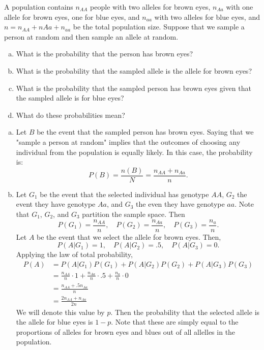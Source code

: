 \documentclass[addpoints,answers]{exam}
\begin{document}
\begin{questions}

\question
   A population contains $n_{AA}$ people with two alleles for brown eyes, $n_{Aa}$ with one allele for brown eyes, one for blue eyes, and $n_{aa}$ with two alleles for blue eyes, and $n=n_{AA}+n{Aa}+n_{aa}$ be the total population size. Suppose that we sample a person at random and then sample an allele at random.
  
  \begin{enumerate}[a)]
  \item What is the probability that the person has brown eyes?
  \item What is the probability that the sampled allele is the allele for brown eyes? 
  \item What is the probability that the sampled person has brown eyes given that the sampled allele is for blue eyes?
  \item What do these probabilities mean?
  \end{enumerate}
  
  \begin{solution}
  \begin{enumerate}[a)]
  \item Let $B$ be the event that the sampled person has brown eyes. Saying that we "sample a person at random" implies that the outcomes of choosing any individual from the population is equally likely. In this case, the probability is:
  $$
  P(B)=\frac{n(B)}{N}=\frac{n_{AA}+n_{Aa}}{n}.
  $$
  
   \item Let $G_1$ be the event that the selected individual has genotype $AA$, $G_2$ the event they have genotype $Aa$, and $G_3$ the even they have genotype $aa$. Note that $G_1$, $G_2$, and $G_3$ partition the sample space. Then
  $$
  P(G_1)=\frac{n_{AA}}{n},\quad P(G_2)=\frac{n_{Aa}}{n},\quad P(G_3)=\frac{n_{a}}{n}.
  $$
  Let $A$ be the event that we select the allele for brown eyes. Then, 
  $$
  P(A|G_1)=1, \quad P(A|G_2)=.5, \quad P(A|G_3)=0.
  $$
  Applying the law of total probability,
  $$
  \begin{aligned}
  P(A)
  &=P(A|G_1)P(G_1) + P(A|G_2)P(G_2) + P(A|G_3)P(G_3)\\
  &=\frac{n_{AA}}{n} \cdot 1 + \frac{n_{Aa}}{n} \cdot .5 + \frac{n_{a}}{n} \cdot 0\\
  &=\frac{n_{AA} + .5n_{Aa}}{n}\\
  &=\frac{2n_{AA} + n_{Aa}}{2n}
  \end{aligned}
  $$
  We will denote this value by $p$. Then the probability that the selected allele is the allele for blue eyes is $1-p$. Note that these are simply equal to the proportions of alleles for brown eyes and blues out of all allelles in the population.


\end{enumerate}
\end{solution}
\end{questions}
\end{document}
